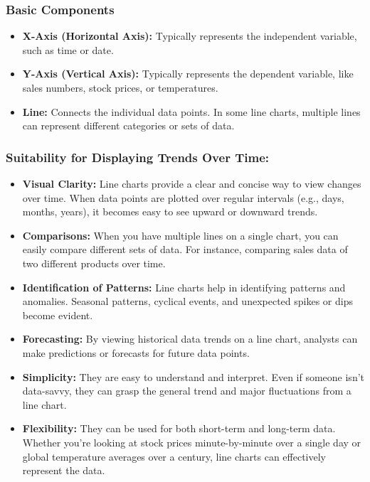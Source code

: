 \documentclass{article}\usepackage[]{graphicx}\usepackage[]{xcolor}
\begin{document}
\subsubsection{Basic Components}
\begin{itemize}
  \item \textbf{X-Axis (Horizontal Axis):} Typically represents the independent variable, such as time or date.
  \item \textbf{Y-Axis (Vertical Axis):} Typically represents the dependent variable, like sales numbers, stock prices, or temperatures.
  \item \textbf{Line:} Connects the individual data points. In some line charts, multiple lines can represent different categories or sets of data.
\end{itemize}


\subsubsection{Suitability for Displaying Trends Over Time:}
\begin{itemize}
    \item \textbf{Visual Clarity:} Line charts provide a clear and concise way to view changes over time. When data points are plotted over regular intervals (e.g., days, months, years), it becomes easy to see upward or downward trends.
    \item \textbf{Comparisons:} When you have multiple lines on a single chart, you can easily compare different sets of data. For instance, comparing sales data of two different products over time.
    \item \textbf{Identification of Patterns:} Line charts help in identifying patterns and anomalies. Seasonal patterns, cyclical events, and unexpected spikes or dips become evident.
    \item \textbf{Forecasting:} By viewing historical data trends on a line chart, analysts can make predictions or forecasts for future data points.
    \item \textbf{Simplicity:} They are easy to understand and interpret. Even if someone isn't data-savvy, they can grasp the general trend and major fluctuations from a line chart.
    \item \textbf{Flexibility:} They can be used for both short-term and long-term data. Whether you're looking at stock prices minute-by-minute over a single day or global temperature averages over a century, line charts can effectively represent the data.
\end{itemize}
\end{document}
